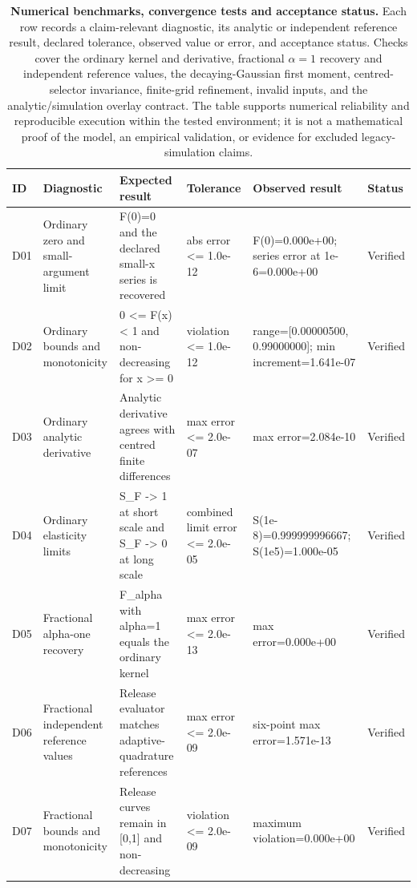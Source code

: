 \begin{table}[H]
\centering
\scriptsize
\caption{\textbf{Numerical benchmarks, convergence tests and acceptance status.} Each row records a claim-relevant diagnostic, its analytic or independent reference result, declared tolerance, observed value or error, and acceptance status. Checks cover the ordinary kernel and derivative, fractional $\alpha=1$ recovery and independent reference values, the decaying-Gaussian first moment, centred-selector invariance, finite-grid refinement, invalid inputs, and the analytic/simulation overlay contract. The table supports numerical reliability and reproducible execution within the tested environment; it is not a mathematical proof of the model, an empirical validation, or evidence for excluded legacy-simulation claims.}
\label{tab:numerical-benchmarks}
\renewcommand{\arraystretch}{1.02}
\begin{tabularx}{\linewidth}{@{}p{0.9cm}p{3.6cm}X p{3.0cm}X p{1.8cm}@{}}
\toprule
ID & Diagnostic & Expected result & Tolerance & Observed result & Status \\
\midrule
D01 & Ordinary zero and small-argument limit & F(0)=0 and the declared small-x series is recovered & abs error <= 1.0e-12 & F(0)=0.000e+00; series error at 1e-6=0.000e+00 & Verified \\
D02 & Ordinary bounds and monotonicity & 0 <= F(x) < 1 and non-decreasing for x >= 0 & violation <= 1.0e-12 & range=[0.00000500, 0.99000000]; min increment=1.641e-07 & Verified \\
D03 & Ordinary analytic derivative & Analytic derivative agrees with centred finite differences & max error <= 2.0e-07 & max error=2.084e-10 & Verified \\
D04 & Ordinary elasticity limits & S\_F -> 1 at short scale and S\_F -> 0 at long scale & combined limit error <= 2.0e-05 & S(1e-8)=0.999999996667; S(1e5)=1.000e-05 & Verified \\
D05 & Fractional alpha-one recovery & F\_alpha with alpha=1 equals the ordinary kernel & max error <= 2.0e-13 & max error=0.000e+00 & Verified \\
D06 & Fractional independent reference values & Release evaluator matches adaptive-quadrature references & max error <= 2.0e-09 & six-point max error=1.571e-13 & Verified \\
D07 & Fractional bounds and monotonicity & Release curves remain in [0,1] and non-decreasing & violation <= 2.0e-09 & maximum violation=0.000e+00 & Verified \\

\end{tabularx}
\end{table}
